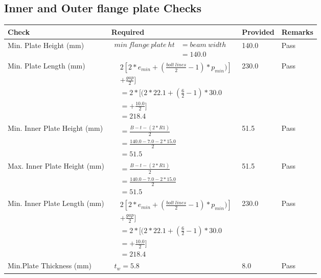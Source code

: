 \documentclass{article}%
\begin{document}
%
\newpage%
\subsection{Inner and Outer flange plate Checks}%
\label{subsec:InnerandOuterflangeplateChecks}%
\renewcommand{\arraystretch}{1.2}%
\begin{longtable}{|p{4cm}|p{6cm}|p{5.5cm}|p{1.5cm}|}%
\hline%
\rowcolor{OsdagGreen}%
Check&Required&Provided&Remarks\\%
\hline%
\endhead%
\hline%
Min. Plate Height (mm)&$\begin{aligned}min~flange~plate~ht &= beam~width\\ &=140.0\end{aligned}$&140.0&Pass\\%
\hline%
Min. Plate Length (mm)&$\begin{aligned} & 2[2*e_{min} + ({\frac{bolt~lines}{2}}-1) * p_{min})]\\ & +\frac{gap}{2}]\\ &=2*[(2*22.1 + (\frac{6}{2}-1) * 30.0\\ &= + \frac{10.0}{2}]\\ &=218.4\end{aligned}$&230.0&Pass\\%
\hline%
Min. Inner Plate Height (mm)&$\begin{aligned}&= \frac{B -t- (2*R1)}{2}\\ &=\frac{140.0 -7.0 - 2*15.0}{2}\\ &=51.5\end{aligned}$&51.5&Pass\\%
\hline%
Max. Inner Plate Height (mm)&$\begin{aligned}&= \frac{B -t- (2*R1)}{2}\\ &=\frac{140.0 -7.0 - 2*15.0}{2}\\ &=51.5\end{aligned}$&51.5&Pass\\%
\hline%
Min. Inner Plate Length (mm)&$\begin{aligned} & 2[2*e_{min} + ({\frac{bolt~lines}{2}}-1) * p_{min})]\\ & +\frac{gap}{2}]\\ &=2*[(2*22.1 + (\frac{6}{2}-1) * 30.0\\ &= + \frac{10.0}{2}]\\ &=218.4\end{aligned}$&230.0&Pass\\%
\hline%
Min.Plate Thickness (mm)&$\begin{aligned} t_w=5.8\end{aligned}$&8.0&Pass\\%
\hline%
\end{longtable}
\end{document}
